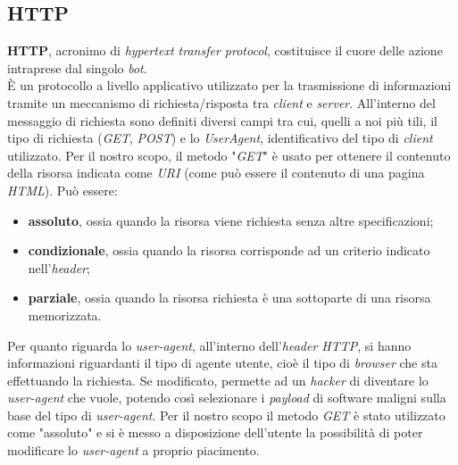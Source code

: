 \subsection{HTTP}
\textbf{HTTP}, acronimo di \textit{hypertext transfer protocol}, costituisce il cuore delle azione intraprese dal singolo \textit{bot}.\\
\`E un protocollo a livello applicativo utilizzato per la
trasmissione di informazioni tramite un meccanismo di richiesta/risposta tra \textit{client} e \textit{server}. All'interno del messaggio di richiesta sono definiti diversi campi tra cui, quelli a noi pi\`u tili, il tipo di
richiesta (\textit{GET}, \textit{POST}) e lo \textit{UserAgent}, identificativo del tipo di \textit{client} utilizzato.
Per il nostro scopo, il metodo "\textit{GET}" \`e usato per ottenere il contenuto della risorsa indicata come \textit{URI} (come pu\`o essere il contenuto di una pagina \textit{HTML}). Pu\`o essere:
\begin{itemize}
\item \textbf{assoluto}, ossia quando la risorsa viene richiesta senza altre specificazioni;
\item \textbf{condizionale}, ossia quando la risorsa corrisponde ad un criterio indicato nell'\textit{header};
\item \textbf{parziale}, ossia quando la risorsa richiesta \`e una sottoparte di una risorsa memorizzata.
\end{itemize}
Per quanto riguarda lo \textit{user-agent}, all'interno dell'\textit{header HTTP}, si hanno informazioni riguardanti il tipo di agente utente, cio\`e il tipo di \textit{browser} che sta effettuando la richiesta. Se modificato, permette ad un \textit{hacker} di diventare lo \textit{user-agent} che vuole, potendo cos\`i selezionare i \textit{payload} di software maligni sulla base del tipo di \textit{user-agent}. 
Per il nostro scopo il metodo \textit{GET} \`e stato utilizzato come "assoluto" e si \`e messo a disposizione dell'utente la possibilit\`a di poter modificare lo \textit{user-agent} a proprio piacimento.

\vspace*{0.5cm}
